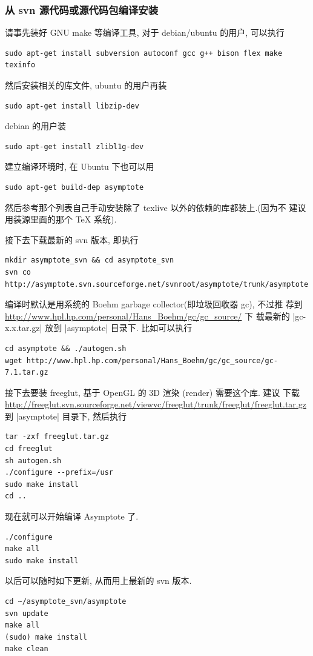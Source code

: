 \documentclass[nofonts,CJKnormalspaces]{ctexbook}[2009/05/20]
\begin{document}
\subsubsection{从 svn 源代码或源代码包编译安装}
请事先装好 GNU make 等编译工具, 对于 debian/ubuntu 的用户, 可以执行
\begin{verbatim}
sudo apt-get install subversion autoconf gcc g++ bison flex make texinfo
\end{verbatim}
然后安装相关的库文件, ubuntu 的用户再装
\begin{verbatim}
sudo apt-get install libzip-dev
\end{verbatim}
debian 的用户装
\begin{verbatim}
sudo apt-get install zlibl1g-dev
\end{verbatim}
建立编译环境时, 在 Ubuntu 下也可以用
\begin{verbatim}
sudo apt-get build-dep asymptote
\end{verbatim}
然后参考那个列表自己手动安装除了 texlive 以外的依赖的库都装上.(因为不
建议用装源里面的那个 TeX 系统).

接下去下载最新的 svn 版本, 即执行
\begin{verbatim}
mkdir asymptote_svn && cd asymptote_svn
svn co http://asymptote.svn.sourceforge.net/svnroot/asymptote/trunk/asymptote
\end{verbatim}
编译时默认是用系统的 Boehm garbage collector(即垃圾回收器 gc), 不过推
荐到 \url{http://www.hpl.hp.com/personal/Hans_Boehm/gc/gc_source/} 下
载最新的 |gc-x.x.tar.gz| 放到 |asymptote| 目录下.
比如可以执行
\begin{verbatim}
cd asymptote && ./autogen.sh
wget http://www.hpl.hp.com/personal/Hans_Boehm/gc/gc_source/gc-7.1.tar.gz
\end{verbatim}

接下去要装 freeglut, 基于 OpenGL 的 3D 渲染 (render) 需要这个库. 建议
下载
\url{http://freeglut.svn.sourceforge.net/viewvc/freeglut/trunk/freeglut/freeglut.tar.gz}
到 |asymptote| 目录下, 然后执行
\begin{verbatim}
tar -zxf freeglut.tar.gz
cd freeglut
sh autogen.sh
./configure --prefix=/usr
sudo make install
cd ..
\end{verbatim}

现在就可以开始编译 Asymptote 了.
\begin{verbatim}
./configure
make all
sudo make install
\end{verbatim}
以后可以随时如下更新, 从而用上最新的 svn 版本.
\begin{verbatim}
cd ~/asymptote_svn/asymptote
svn update
make all
(sudo) make install
make clean
\end{verbatim}
\end{document}
